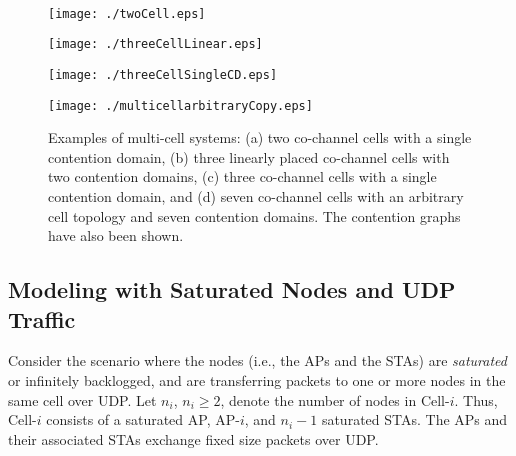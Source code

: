 \documentclass[10pt,a4paper,journal]{IEEEtran}
\theoremstyle{definition}
\theoremstyle{remark}
\theoremstyle{plain}
\begin{document}
\begin{figure}[tb]
  \centering \
  \begin{minipage}{1.5cm}
    \begin{center}
      \texttt{[image: ./twoCell.eps]}
      \subfigure[]{\label{fig:twoCell}}
    \end{center}
  \end{minipage}
\hspace{1cm}
  \begin{minipage}{2.5cm}
    \begin{center}
      \texttt{[image: ./threeCellLinear.eps]}
      \subfigure[]{\label{fig:threeCellLinear}}
    \end{center}
  \end{minipage}
\hspace{2cm}
  \begin{minipage}{2.75cm}
    \begin{center}
      \texttt{[image: ./threeCellSingleCD.eps]}
      \subfigure[]{\label{fig:threeCellSingleCD}}
    \end{center}
  \end{minipage}
\hspace{1.5cm}
  \begin{minipage}{2.75cm}
    \begin{center}
      \texttt{[image: ./multicellarbitraryCopy.eps]}
      \subfigure[]{\label{fig:sevenCellArbitrary}}
    \end{center}
  \end{minipage}
  \hfill
  \caption{Examples of multi-cell systems: (a) two co-channel cells
    with a single contention domain, (b) three linearly placed
    co-channel cells with two contention domains, (c) three co-channel
    cells with a single contention domain, and (d) seven co-channel
    cells with an arbitrary cell topology and seven contention
    domains. The contention graphs have also been shown.}
\end{figure}



\subsection{Modeling with Saturated Nodes and UDP Traffic}
\label{subsec:saturated-case}

Consider the scenario where the nodes (i.e., the APs and the STAs) are \textit{saturated} or infinitely backlogged, and are transferring packets to one or more nodes in the same cell over UDP. Let $n_i$, $n_i \geq 2$, denote the number of nodes in Cell-$i$. Thus, Cell-$i$ consists of a saturated AP, AP-$i$, and $n_i - 1$ saturated STAs. The APs and their associated STAs exchange fixed size packets over UDP.
\end{document}
